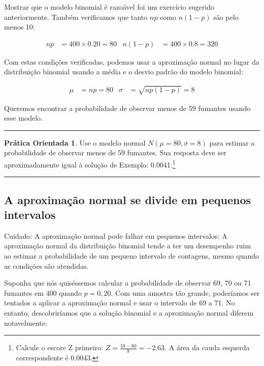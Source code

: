 \documentclass[
]{book}
\theoremstyle{definition}
\theoremstyle{definition}
\theoremstyle{definition}
\newtheorem{exercise}{Prática Orientada}[chapter]
\theoremstyle{definition}
\theoremstyle{remark}
\begin{document}
Mostrar que o modelo binomial é razoável foi um exercício sugerido anteriormente. Também verificamos que tanto \(np\) como \(n(1-p)\) são pelo menos 10:

\begin{align*}
np&=400\times 0.20=80
&n(1-p)&=400\times 0.8=320
\end{align*}

Com estas condições verificadas, podemos usar a aproximação normal no lugar da distribuição binomial usando a média e o desvio padrão do modelo binomial:

\begin{align*}
\mu &= np = 80
&\sigma &= \sqrt{np(1-p)} = 8
\end{align*}

Queremos encontrar a probabilidade de observar menos de 59 fumantes usando esse modelo.

\begin{center}\rule{0.5\linewidth}{0.5pt}\end{center}

\begin{exercise}
\protect\hypertarget{exr:unnamed-chunk-140}{}{\label{exr:unnamed-chunk-140} }Use o modelo normal \(N(\mu=80, \sigma=8)\) para estimar a probabilidade de observar menos de 59 fumantes. Sua resposta deve ser aproximadamente igual à solução de Exemplo: 0.0041.\footnote{Calcule o escore Z primeiro: \(Z=\frac{59 - 80}{8} = -2.63\). A área da cauda esquerda correspondente é 0.0043.}
\end{exercise}

\begin{center}\rule{0.5\linewidth}{0.5pt}\end{center}

\hypertarget{normalApproximationSmallIntervals}{%
\subsection{A aproximação normal se divide em pequenos intervalos}\label{normalApproximationSmallIntervals}}

Cuidado: A aproximação normal pode falhar em pequenos intervalos: A aproximação normal da distribuição binomial tende a ter um desempenho ruim ao estimar a probabilidade de um pequeno intervalo de contagens, mesmo quando as condições são atendidas.

Suponha que nós quiséssemos calcular a probabilidade de observar 69, 70 ou 71 fumantes em 400 quando \(p=0,20\). Com uma amostra tão grande, poderíamos ser tentados a aplicar a aproximação normal e usar o intervalo de 69 a 71. No entanto, descobriríamos que a solução binomial e a aproximação normal diferem notavelmente:
\end{document}
